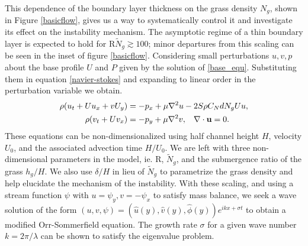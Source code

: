 \documentclass[aps,prl,twocolumn,superscriptaddress,10pt]{revtex4-1}  %
\newcommand{\bu}{\mathbf{u}}
\newcommand{\Rey}{\text{R}}
\newcommand{\Ndg}{\tilde{N}_g}
\begin{document}
This dependence of the boundary layer thickness on the grass density $N_g$, shown in Figure \ref{basicflow}, gives us a way to systematically control it and investigate its effect on the instability mechanism.
The asymptotic regime of a thin boundary layer is expected to hold for $\Rey \Ndg \gtrsim 100$; minor departures from this scaling can be seen in the inset of figure \ref{basicflow}.
\newline
Considering small perturbations $u, v, p$ about the base profile $U$ and $P$ given by the solution of \eqref{base_equ}. Substituting them in equation \eqref{navier-stokes} and expanding  to linear order in the perturbation variable we obtain.
\begin{equation}
\begin{split}
\rho(u_t+U u_x+vU_y) &= -p_x+ {\mu}\nabla^2u-2S\rho C_{N}dN_{g}Uu, \\
\rho(v_t+ Uv_x) &= -p_y+ {\mu}\nabla^2v, \hspace{0.3cm} \nabla\cdot\bu=0.
\end{split}
\end{equation}
These equations can be non-dimensionalized using half channel height $H$, velocity $U_0$, and the associated advection time $H/U_0$. 
We are left with three non-dimensional parameters in the model, ie. $\Rey$, $\Ndg$, and the submergence ratio of the grass $h_g/H$. 
We also use $\delta/H$ in lieu of $\Ndg$ to parametrize the grass density and help elucidate the mechanism of the instability. 
With these scaling, and using a stream function $\psi$ with $u = \psi_{y}, v= -\psi_x$ to satisfy mass balance, we seek a wave solution of 
the form $\left(u,v,\psi \right)= \left(\hat u(y), \hat v(y), \hat\phi(y) \right)e^{ikx+\sigma t}$ to  obtain a modified Orr-Sommerfield equation. 
The growth rate $\sigma$ for a given wave number $k=2\pi /\lambda$ can be shown to satisfy the eigenvalue problem.
\end{document}
